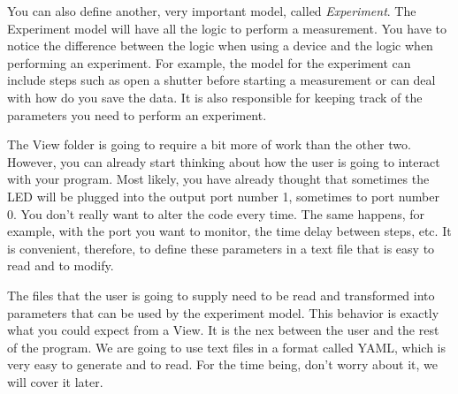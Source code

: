 
You can also define another, very important model, called
\emph{Experiment}. The Experiment model will have all the logic to
perform a measurement. You have to notice the difference between the
logic when using a device and the logic when performing an experiment.
For example, the model for the experiment can include steps such as open
a shutter before starting a measurement or can deal with how do you save
the data. It is also responsible for keeping track of the parameters you
need to perform an experiment.


The View folder is going to require a bit more of work than the other
two. However, you can already start thinking about how the user is going
to interact with your program. Most likely, you have already thought
that sometimes the {LED} will be plugged into the output port number 1,
sometimes to port number 0. You don't really want to alter the code
every time. The same happens, for example, with the port you want to
monitor, the time delay between steps, etc. It is convenient, therefore,
to define these parameters in a text file that is easy to read and
to modify.

The files that the user is going to supply need to be read and
transformed into parameters that can be used by the experiment model.
This behavior is exactly what you could expect from a View. It is the
nex between the user and the rest of the program. We are going to use
text files in a format called {YAML}, which is very easy to generate and
to read. For the time being, don't worry about it, we will cover
it later.


